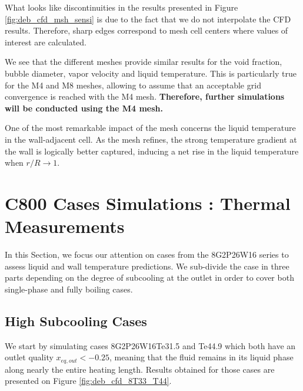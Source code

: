 \begin{note*}{}
What looks like discontinuities in the results presented in Figure \ref{fig:deb_cfd_msh_sensi} is due to the fact that we do not interpolate the CFD results. Therefore, sharp edges correspond to mesh cell centers where values of interest are calculated.
\end{note*}


We see that the different meshes provide similar results for the void fraction, bubble diameter, vapor velocity and liquid temperature. This is particularly true for the M4 and M8 meshes, allowing to assume that an acceptable grid convergence is reached with the M4 mesh. \textbf{Therefore, further simulations will be conducted using the M4 mesh.}

\begin{remark*}{}
One of the most remarkable impact of the mesh concerns the liquid temperature in the wall-adjacent cell. As the mesh refines, the strong temperature gradient at the wall is logically better captured, inducing a net rise in the liquid temperature when $r/R \to 1$.
\end{remark*}



\section{C800 Cases Simulations : Thermal Measurements}
\label{sec:deb_cfd_c8}

In this Section, we focus our attention on cases from the 8G2P26W16 series to assess liquid and wall temperature predictions. We sub-divide the case in three parts depending on the degree of subcooling at the outlet in order to cover both single-phase and fully boiling cases.



\subsection{High Subcooling Cases}

We start by simulating cases 8G2P26W16Te31.5 and Te44.9 which both have an outlet quality $x_{eq,out}<-0.25$, meaning that the fluid remains in its liquid phase along nearly the entire heating length. Results obtained for those cases are presented on Figure \ref{fig:deb_cfd_8T33_T44}.

